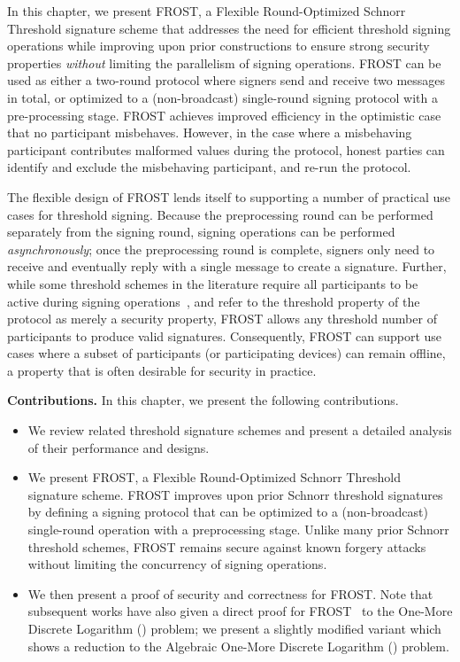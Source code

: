 In this chapter, we present FROST,
a Flexible
Round-Optimized Schnorr Threshold
signature scheme that addresses the need for efficient
threshold signing operations while improving upon prior constructions to
ensure strong security properties \emph{without} limiting the parallelism of
signing operations.
FROST can be used as either a two-round protocol where signers send
and receive two messages in total, or optimized to a (non-broadcast)
single-round signing protocol with a pre-processing stage.
FROST achieves improved efficiency in the optimistic
case that no participant misbehaves.
However, in the case where a misbehaving participant contributes malformed
values during the protocol, honest parties can identify and exclude the
misbehaving participant, and re-run the protocol.

The flexible design of FROST lends itself to supporting a number of practical
use cases for threshold signing. Because the preprocessing round can be
performed separately from the signing round, signing operations can be performed
\emph{asynchronously};
once the preprocessing round is complete, signers only need to receive and eventually reply with a single message to create a signature.
Further, while some threshold schemes in the literature require all
participants to be active during signing
operations~\cite{GennaroJKR03, DamgardJNPO22}, and refer
to the threshold
property of the protocol as merely a security property, FROST allows any
threshold number of participants to produce valid signatures. Consequently,
FROST can support use cases where a subset of participants (or participating
devices) can remain offline, a property that is often desirable for
security in practice.

\medskip\noindent
\textbf{Contributions.} In this chapter, we present the
following contributions.
\begin{itemize}
  \item We review related threshold signature schemes and present a
    detailed analysis of their performance and designs.
  \item {\sloppy We present FROST, a Flexible Round-Optimized Schnorr Threshold signature
    scheme.
    FROST improves upon prior Schnorr threshold signatures by defining a
    signing protocol that can be optimized to a (non-broadcast) single-round
    operation with a preprocessing stage.
    Unlike many prior Schnorr threshold schemes, FROST remains secure against
    known forgery attacks without limiting the concurrency of signing operations.\par}
  \item We then present a proof of security and correctness for FROST.
Note that subsequent works have also given a direct proof for FROST~\cite{BellareCKMTZ22} to the One-More Discrete Logarithm (\OMDL) problem;
we present a slightly modified variant which shows a reduction to the Algebraic One-More Discrete Logarithm (\AOMDL) problem.
\end{itemize}

